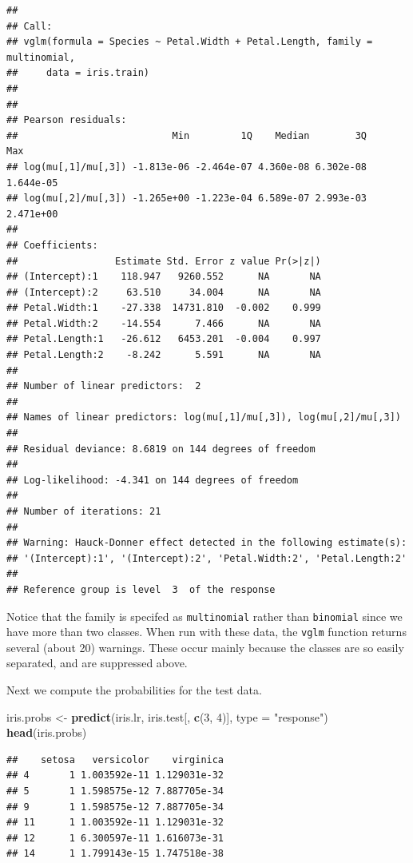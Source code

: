 \documentclass[]{article}
\newenvironment{Shaded}{\begin{snugshade}}{\end{snugshade}}
\newcommand{\KeywordTok}[1]{\textcolor[rgb]{0.13,0.29,0.53}{\textbf{#1}}}
\newcommand{\DataTypeTok}[1]{\textcolor[rgb]{0.13,0.29,0.53}{#1}}
\newcommand{\DecValTok}[1]{\textcolor[rgb]{0.00,0.00,0.81}{#1}}
\newcommand{\StringTok}[1]{\textcolor[rgb]{0.31,0.60,0.02}{#1}}
\newcommand{\NormalTok}[1]{#1}
\begin{document}
\begin{verbatim}
## 
## Call:
## vglm(formula = Species ~ Petal.Width + Petal.Length, family = multinomial, 
##     data = iris.train)
## 
## 
## Pearson residuals:
##                           Min         1Q    Median        3Q       Max
## log(mu[,1]/mu[,3]) -1.813e-06 -2.464e-07 4.360e-08 6.302e-08 1.644e-05
## log(mu[,2]/mu[,3]) -1.265e+00 -1.223e-04 6.589e-07 2.993e-03 2.471e+00
## 
## Coefficients: 
##                 Estimate Std. Error z value Pr(>|z|)
## (Intercept):1    118.947   9260.552      NA       NA
## (Intercept):2     63.510     34.004      NA       NA
## Petal.Width:1    -27.338  14731.810  -0.002    0.999
## Petal.Width:2    -14.554      7.466      NA       NA
## Petal.Length:1   -26.612   6453.201  -0.004    0.997
## Petal.Length:2    -8.242      5.591      NA       NA
## 
## Number of linear predictors:  2 
## 
## Names of linear predictors: log(mu[,1]/mu[,3]), log(mu[,2]/mu[,3])
## 
## Residual deviance: 8.6819 on 144 degrees of freedom
## 
## Log-likelihood: -4.341 on 144 degrees of freedom
## 
## Number of iterations: 21 
## 
## Warning: Hauck-Donner effect detected in the following estimate(s):
## '(Intercept):1', '(Intercept):2', 'Petal.Width:2', 'Petal.Length:2'
## 
## Reference group is level  3  of the response
\end{verbatim}

Notice that the family is specifed as \texttt{multinomial} rather than
\texttt{binomial} since we have more than two classes. When run with
these data, the \texttt{vglm} function returns several (about 20)
warnings. These occur mainly because the classes are so easily
separated, and are suppressed above.

Next we compute the probabilities for the test data.

\begin{Shaded}
\begin{Highlighting}[]
\NormalTok{iris.probs <-}\StringTok{ }\KeywordTok{predict}\NormalTok{(iris.lr, iris.test[, }\KeywordTok{c}\NormalTok{(}\DecValTok{3}\NormalTok{, }\DecValTok{4}\NormalTok{)], }\DataTypeTok{type =} \StringTok{"response"}\NormalTok{)}
\KeywordTok{head}\NormalTok{(iris.probs)}
\end{Highlighting}
\end{Shaded}

\begin{verbatim}
##    setosa   versicolor    virginica
## 4       1 1.003592e-11 1.129031e-32
## 5       1 1.598575e-12 7.887705e-34
## 9       1 1.598575e-12 7.887705e-34
## 11      1 1.003592e-11 1.129031e-32
## 12      1 6.300597e-11 1.616073e-31
## 14      1 1.799143e-15 1.747518e-38
\end{verbatim}
\end{document}

